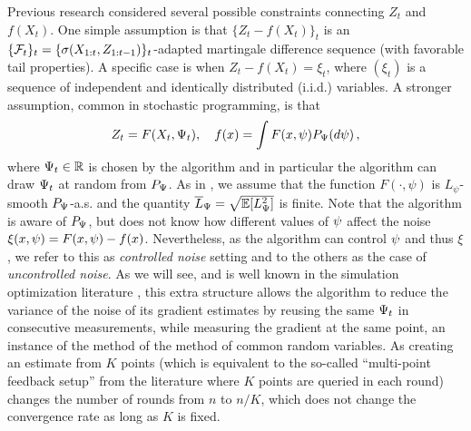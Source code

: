 Previous research considered several possible constraints connecting $Z_t$ and $f(X_t)$.
One simple assumption is that $\{Z_t-f(X_t)\}_t$ is an $\{\mathcal{F}_t\}_t = \{\sigma(X_{1:t},Z_{1:t-1})\}_t$-adapted martingale difference sequence (with favorable tail properties).
A specific case is when $Z_t - f(X_t) = \xi_t$, where $(\xi_t)$ is a sequence of independent and identically distributed (i.i.d.) variables.
A stronger assumption, common in stochastic programming, is that 
\begin{equation}
\label{eq:controlled}
Z_t = F(X_t,\Psi_t), \quad f(x) = \int F(x,\psi) P_{\Psi}(d\psi)\,,
\end{equation} 
where $\Psi_t\in \mathbb{R}$ is chosen by the algorithm and in particular the algorithm can draw $\Psi_t$ 
at random from $P_{\Psi}$.
As in \cite{duchi2015optimal}, we assume that the function $F(\cdot, \psi)$ is $L_{\psi}$-smooth $P_{\Psi}$-a.s. and the quantity $\overline{L}_{\Psi} = \sqrt{\mathbb{E} [L_{\Psi}^2]}$ is finite.  
Note that the algorithm is aware of $P_{\Psi}$, but does not know how different values of $\psi$ affect the noise $\xi(x,\psi)=F(x,\psi)-f(x)$. Nevertheless, as the algorithm can control $\psi$ and thus $\xi$, we refer to this as
\emph{controlled noise} setting and to the others as the case of \emph{uncontrolled noise}.
As we will see, and is well known in the simulation optimization literature \citep{KlSpNa99,duchi2015optimal},
this extra structure allows the algorithm to reduce the variance of the noise of its gradient estimates by reusing the same $\Psi_t$ in consecutive measurements, while measuring the gradient at the same point, an instance of the method of the method of common random variables.
As creating an estimate from $K$ points (which is equivalent to the so-called ``multi-point feedback setup'' from the literature where $K$ points are queried in each round) changes the number of rounds from $n$ to $n/K$, which does not change the convergence rate as long as $K$ is fixed. 


%
%



